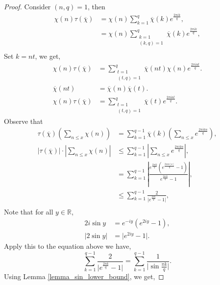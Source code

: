 \documentclass{article}
\newcommand{\R}[0]{\mathbb{R}}
\begin{document}
\begin{proof}
  \par Consider $(n,q)=1$, then 
  \begin{align*}
    \chi(n)\tau(\overline{\chi}) & = \chi(n)\sum_{k=1}^q\overline{\chi}(k)e^{{\frac {2\pi i k} q}},\\
    & = \chi(n)\sum_{\substack{k=1\\(k,q)=1}}^q\overline{\chi}(k)e^{{\frac {2\pi i k} q}},\\
  \end{align*}
  Set $k = nt$, we get,
  \begin{align*}
    \chi(n)\tau(\overline{\chi}) & = \sum_{\substack{t=1\\ (t,q)=1}}^q\overline{\chi}(nt)\chi(n)e^{{\frac {2\pi i nt} q}}.\\
    \overline{\chi}(nt) & = \overline{\chi}(n)\overline{\chi}(t).\\
    \chi(n)\tau(\overline{\chi}) & = \sum_{\substack{t=1\\ (t,q)=1}}^q\overline{\chi}(t)e^{{\frac {2\pi i nt} q}}.
  \end{align*}
  Observe that 
  \begin{align*}
    \tau(\overline{\chi})\left(\sum_{n\leq x}\chi(n)\right) & = \sum_{k=1}^{q-1}\overline{\chi}(k)\left(\sum_{n\leq x}e^{{\frac {2\pi i kn} q}}\right),\\
    \vert\tau(\overline{\chi})\vert\cdot\left\vert\sum_{n\leq x}\chi(n)\right\vert & \leq \sum_{k=1}^{q-1}\left\vert\sum_{n\leq x}e^{{\frac {2\pi i kn} q}}\right\vert,\\
    & = \sum_{k=1}^{q-1}\left\vert{\frac {e^{{\frac {2\pi i k} q}}\left(e^{{\frac {2\pi in[x]} q}}-1\right)} {e^{{\frac {2\pi i k} q}} - 1}}\right\vert,\\
    &\leq \sum_{k=1}^{q-1}{\frac 2 {\vert e^{{\frac {2\pi k} q}}-1\vert}},\\
  \end{align*}
  Note that for all $y\in \R$,
  \begin{align*}
    2 i\sin y &= e^{-iy}(e^{2iy}-1),\\
    \vert 2\sin y\vert & = \vert e^{2iy}-1\vert.
  \end{align*}
  Apply this to the equation above we have,
  \begin{equation*}
    \sum_{k=1}^{q-1}{\frac 2 {\vert e^{{\frac {2\pi k} q}}-1\vert}} = \sum_{k=1}^{q-1}{\frac 1 {\vert\sin{\frac {\pi k} q}\vert}}.
  \end{equation*}
  Using Lemma \ref{lemma_sin_lower_bound}, we get,

\end{proof}
\end{document}
